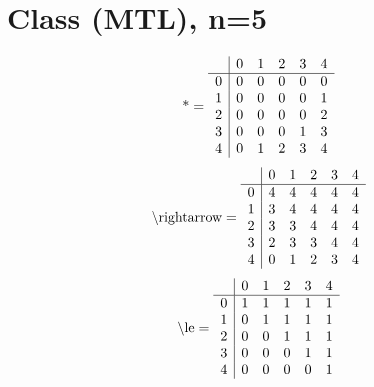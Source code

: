 \documentclass[11pt]{article}
\begin{document}
\section{Class (MTL), n=5}
\[\text{*} = 
\begin{array}{r | r r r r r}
 & 0 & 1 & 2 & 3 & 4 \\ \hline
0 & 0 & 0 & 0 & 0 & 0 \\
1 & 0 & 0 & 0 & 0 & 1 \\
2 & 0 & 0 & 0 & 0 & 2 \\
3 & 0 & 0 & 0 & 1 & 3 \\
4 & 0 & 1 & 2 & 3 & 4 \\
\end{array}
\]
\[\text{\textbackslash rightarrow} = 
\begin{array}{r | r r r r r}
 & 0 & 1 & 2 & 3 & 4 \\ \hline
0 & 4 & 4 & 4 & 4 & 4 \\
1 & 3 & 4 & 4 & 4 & 4 \\
2 & 3 & 3 & 4 & 4 & 4 \\
3 & 2 & 3 & 3 & 4 & 4 \\
4 & 0 & 1 & 2 & 3 & 4 \\
\end{array}
\]
\[\text{\textbackslash le} = 
\begin{array}{r | r r r r r}
 & 0 & 1 & 2 & 3 & 4 \\ \hline
0 & 1 & 1 & 1 & 1 & 1 \\
1 & 0 & 1 & 1 & 1 & 1 \\
2 & 0 & 0 & 1 & 1 & 1 \\
3 & 0 & 0 & 0 & 1 & 1 \\
4 & 0 & 0 & 0 & 0 & 1 \\
\end{array}
\]
\end{document}
